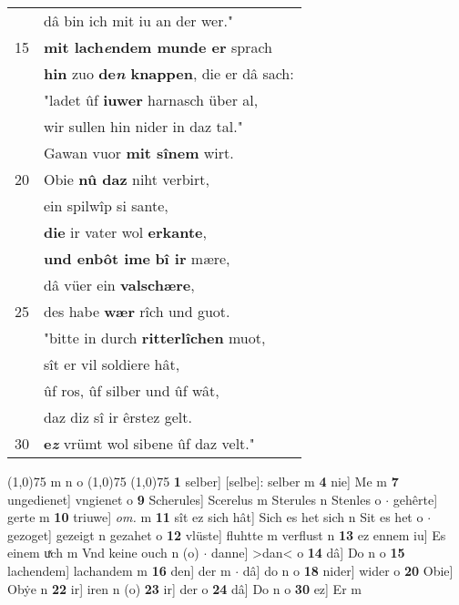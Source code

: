 \documentclass[8pt,a4paper,notitlepage]{article}
\begin{document}
\begin{table}[ht]
\begin{minipage}[t]{0.5\linewidth}
\begin{tabular}{rl}
 & dâ bin ich mit iu an der wer."\\ 
15 & \textbf{mit lach\textit{e}ndem munde er} sprach\\ 
 & \textbf{hin} zuo \textbf{de\textit{n} knappen}, die er dâ sach:\\ 
 & "ladet ûf \textbf{iuwer} harnasch über al,\\ 
 & wir sullen hin nider in daz tal."\\ 
 & Gawan vuor \textbf{mit sînem} wirt.\\ 
20 & Obie \textbf{nû daz} niht verbirt,\\ 
 & ein spilwîp si sante,\\ 
 & \textbf{die} ir vater wol \textbf{erkante},\\ 
 & \textbf{und enbôt ime} \textbf{bî ir} mære,\\ 
 & dâ vüer ein \textbf{valschære},\\ 
25 & des habe \textbf{wær} rîch und guot.\\ 
 & "bitte in durch \textbf{ritterlîchen} muot,\\ 
 & sît er vil soldiere hât,\\ 
 & ûf ros, ûf silber und ûf wât,\\ 
 & daz diz sî ir êrstez gelt.\\ 
30 & \textbf{e\textit{z}} vrümt wol sibene ûf daz velt."\\ 
\end{tabular}
\scriptsize
\line(1,0){75} \newline
m n o \newline
\line(1,0){75} \newline
\newline
\line(1,0){75} \newline
\textbf{1} selber] [selbe]: selber m \textbf{4} nie] Me m \textbf{7} ungedienet] vngienet o \textbf{9} Scherules] Scerelus m Sterules n Stenles o  $\cdot$ gehêrte] gerte m \textbf{10} triuwe] \textit{om.} m \textbf{11} sît ez sich hât] Sich es het sich n Sit es het o  $\cdot$ gezoget] gezeigt n gezahet o \textbf{12} vlüste] fluhtte m verflust n \textbf{13} ez ennem iu] Es einem uͯch m Vnd keine ouch n (o)  $\cdot$ danne] >dan< o \textbf{14} dâ] Do n o \textbf{15} lachendem] lachandem m \textbf{16} den] der m  $\cdot$ dâ] do n o \textbf{18} nider] wider o \textbf{20} Obie] Obẏe n \textbf{22} ir] iren n (o) \textbf{23} ir] der o \textbf{24} dâ] Do n o \textbf{30} ez] Er m \newline
\end{minipage}
\end{table}
\end{document}
